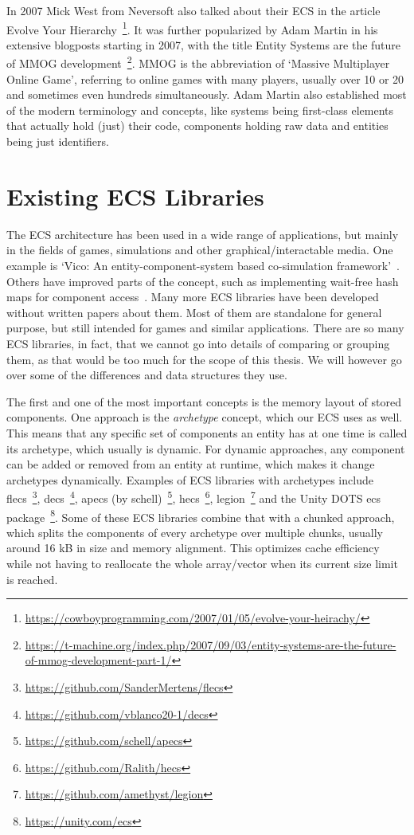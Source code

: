 In 2007 Mick West from Neversoft also talked about their ECS in the article \textsf{Evolve Your Hierarchy}~\footnote{\url{https://cowboyprogramming.com/2007/01/05/evolve-your-heirachy/}}. It was further popularized by Adam Martin in his extensive blogposts starting in 2007, with the title \textsf{Entity Systems are the future of MMOG development}~\footnote{\url{https://t-machine.org/index.php/2007/09/03/entity-systems-are-the-future-of-mmog-development-part-1/}}. MMOG is the abbreviation of `Massive Multiplayer Online Game', referring to online games with many players, usually over 10 or 20 and sometimes even hundreds simultaneously. Adam Martin also established most of the modern terminology and concepts, like systems being first-class elements that actually hold (just) their code, components holding raw data and entities being just identifiers.

\section{Existing ECS Libraries}

The ECS architecture has been used in a wide range of applications, but mainly in the fields of games, simulations and other graphical/interactable media. One example is `Vico: An entity-component-system based co-simulation framework'~\cite{hatledal2021vico}. Others have improved parts of the concept, such as implementing wait-free hash maps for component access~\cite{lange2016wait}. Many more ECS libraries have been developed without written papers about them. Most of them are standalone for general purpose, but still intended for games and similar applications. There are so many ECS libraries, in fact, that we cannot go into details of comparing or grouping them, as that would be too much for the scope of this thesis. We will however go over some of the differences and data structures they use.

The first and one of the most important concepts is the memory layout of stored components. One approach is the \textit{archetype} concept, which our ECS uses as well. This means that any specific set of components an entity has at one time is called its archetype, which usually is dynamic. For dynamic approaches, any component can be added or removed from an entity at runtime, which makes it change archetypes dynamically. Examples of ECS libraries with archetypes include \textsf{flecs}~\footnote{\url{https://github.com/SanderMertens/flecs}}, \textsf{decs}~\footnote{\url{https://github.com/vblanco20-1/decs}}, \textsf{apecs} (by schell)~\footnote{\url{https://github.com/schell/apecs}}, \textsf{hecs}~\footnote{\url{https://github.com/Ralith/hecs}}, \textsf{legion}~\footnote{\url{https://github.com/amethyst/legion}} and the Unity DOTS ecs package~\footnote{\url{https://unity.com/ecs}}. Some of these ECS libraries combine that with a chunked approach, which splits the components of every archetype over multiple chunks, usually around 16 kB in size and memory alignment. This optimizes cache efficiency while not having to reallocate the whole array/vector when its current size limit is reached.

